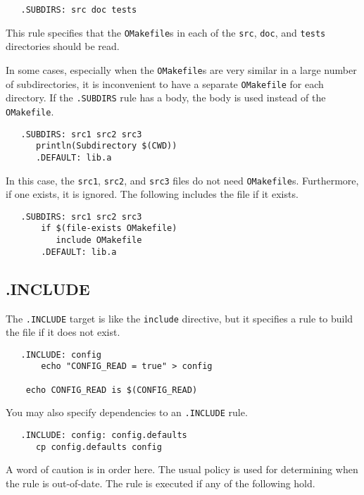 \begin{verbatim}
   .SUBDIRS: src doc tests
\end{verbatim}

This rule specifies that the \verb+OMakefile+s in each of the \verb+src+, \verb+doc+, and
\verb+tests+ directories should be read.

In some cases, especially when the \verb+OMakefile+s are very similar in a large number of
subdirectories, it is inconvenient to have a separate \verb+OMakefile+ for each directory.  If the
\verb+.SUBDIRS+ rule has a body, the body is used instead of the \verb+OMakefile+.

\begin{verbatim}
   .SUBDIRS: src1 src2 src3
      println(Subdirectory $(CWD))
      .DEFAULT: lib.a
\end{verbatim}

In this case, the \verb+src1+, \verb+src2+, and \verb+src3+ files do not need \verb+OMakefile+s.
Furthermore, if one exists, it is ignored.  The following includes the file if it exists.

\begin{verbatim}
   .SUBDIRS: src1 src2 src3
       if $(file-exists OMakefile)
          include OMakefile
       .DEFAULT: lib.a
\end{verbatim}

\subsection{.INCLUDE}

The \verb+.INCLUDE+ target is like the \verb+include+ directive, but it specifies a rule to build
the file if it does not exist.

\begin{verbatim}
   .INCLUDE: config
       echo "CONFIG_READ = true" > config

    echo CONFIG_READ is $(CONFIG_READ)
\end{verbatim}

You may also specify dependencies to an \verb+.INCLUDE+ rule.

\begin{verbatim}
   .INCLUDE: config: config.defaults
      cp config.defaults config
\end{verbatim}

A word of caution is in order here.  The usual policy is used for determining when the rule is
out-of-date.  The rule is executed if any of the following hold.

